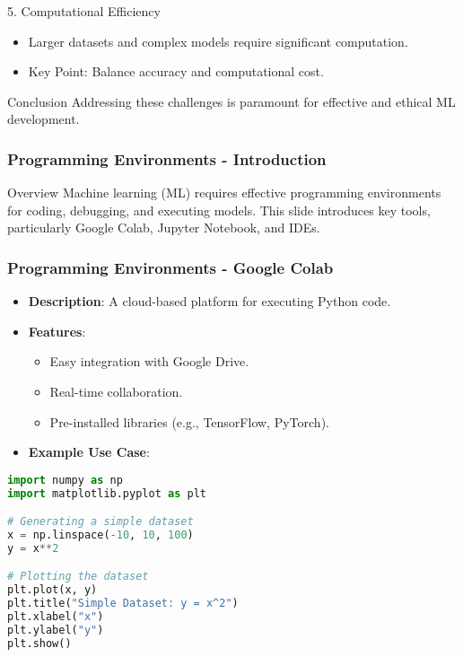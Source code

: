 \documentclass[aspectratio=169]{beamer}
\begin{document}
\begin{frame}[fragile]
    \begin{block}{5. Computational Efficiency}
        \begin{itemize}
            \item Larger datasets and complex models require significant computation.
            \item Key Point: Balance accuracy and computational cost.
        \end{itemize}
    \end{block}

    \begin{block}{Conclusion}
        Addressing these challenges is paramount for effective and ethical ML development.
    \end{block}
\end{frame}

\begin{frame}[fragile]
    \frametitle{Programming Environments - Introduction}
    \begin{block}{Overview}
        Machine learning (ML) requires effective programming environments for coding, debugging, and executing models. This slide introduces key tools, particularly Google Colab, Jupyter Notebook, and IDEs.
    \end{block}
\end{frame}

\begin{frame}[fragile]
    \frametitle{Programming Environments - Google Colab}
    \begin{itemize}
        \item \textbf{Description}: A cloud-based platform for executing Python code.
        \item \textbf{Features}:
            \begin{itemize}
                \item Easy integration with Google Drive.
                \item Real-time collaboration.
                \item Pre-installed libraries (e.g., TensorFlow, PyTorch).
            \end{itemize}
        \item \textbf{Example Use Case}:
    \end{itemize}
    \begin{lstlisting}[language=Python]
import numpy as np
import matplotlib.pyplot as plt

# Generating a simple dataset
x = np.linspace(-10, 10, 100)
y = x**2

# Plotting the dataset
plt.plot(x, y)
plt.title("Simple Dataset: y = x^2")
plt.xlabel("x")
plt.ylabel("y")
plt.show()
    \end{lstlisting}
\end{frame}
\end{document}
